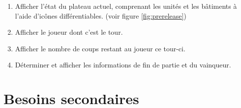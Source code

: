 \documentclass[a4paper]{report}
\begin{document}
\begin{enumerate}
\item Afficher l'état du plateau actuel, comprenant les unités et les bâtiments à l'aide d'icônes différentiables. (voir figure \ref{fig:prerelease})

\item Afficher le joueur dont c'est le tour.

\item Afficher le nombre de coups restant au joueur ce tour-ci.

\item Déterminer et afficher les informations de fin de partie et du vainqueur.

\end{enumerate}

\section{Besoins secondaires} %
\end{document}
